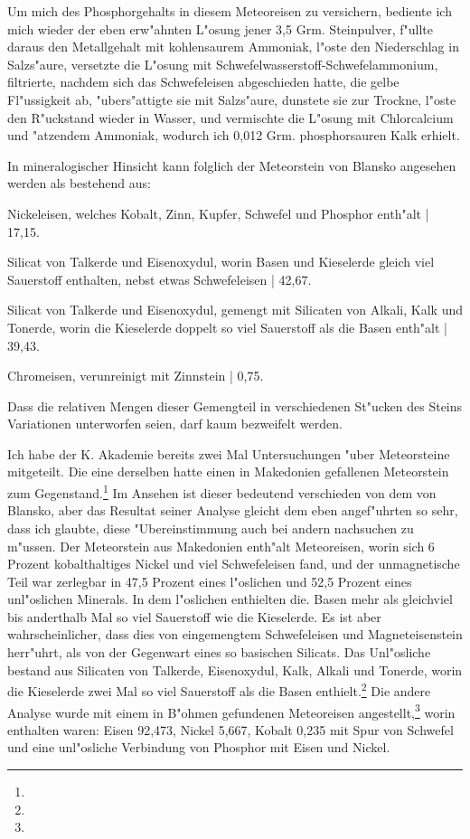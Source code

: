 \documentclass[a4paper, 11pt, oneside]{article}
\begin{document}
Um mich des Phosphorgehalts in diesem Meteoreisen zu versichern, bediente ich mich wieder der eben erw"ahnten L"osung jener 3,5 Grm. Steinpulver, f"ullte daraus den Metallgehalt mit kohlensaurem Ammoniak‚ l"oste den Niederschlag in Salzs"aure, versetzte die L"osung mit Schwefelwasserstoff-Schwefelammonium, filtrierte, nachdem sich das Schwefeleisen abgeschieden hatte, die gelbe Fl"ussigkeit ab, "ubers"attigte sie mit Salzs"aure, dunstete sie zur Trockne, l"oste den R"uckstand wieder in Wasser, und vermischte die L"osung mit Chlorcalcium und "atzendem Ammoniak, wodurch ich 0,012 Grm. phosphorsauren Kalk erhielt.

In mineralogischer Hinsicht kann folglich der Meteorstein von Blansko angesehen werden als bestehend aus:

Nickeleisen, welches Kobalt, Zinn, Kupfer, Schwefel und Phosphor enth"alt | 17,15.

Silicat von Talkerde und Eisenoxydul, worin Basen und Kieselerde gleich viel Sauerstoff enthalten, nebst etwas Schwefeleisen | 42,67.

Silicat von Talkerde und Eisenoxydul, gemengt mit Silicaten von Alkali, Kalk und Tonerde, worin die Kieselerde doppelt so viel Sauerstoff als die Basen enth"alt | 39,43.

Chromeisen, verunreinigt mit Zinnstein | 0,75.

Dass die relativen Mengen dieser Gemengteil in verschiedenen St"ucken des Steins Variationen unterworfen seien, darf kaum bezweifelt werden.

Ich habe der K. Akademie bereits zwei Mal Untersuchungen "uber Meteorsteine mitgeteilt. Die eine derselben hatte einen in Makedonien gefallenen Meteorstein zum Gegenstand.\footnote{} Im Ansehen ist dieser bedeutend verschieden von dem von Blansko, aber das Resultat seiner Analyse gleicht dem eben angef"uhrten so sehr, dass ich glaubte, diese "Ubereinstimmung auch bei andern nachsuchen zu m"ussen. Der Meteorstein aus Makedonien enth"alt Meteoreisen, worin sich 6 Prozent kobalthaltiges Nickel und viel Schwefeleisen fand, und der unmagnetische Teil war zerlegbar in 47,5 Prozent eines l"oslichen und 52,5 Prozent eines unl"oslichen Minerals. In dem l"oslichen enthielten die. Basen mehr als gleichviel bis anderthalb Mal so viel Sauerstoff wie die Kieselerde. Es ist aber wahrscheinlicher, dass dies von eingemengtem Schwefeleisen und Magneteisenstein herr"uhrt, als von der Gegenwart eines so basischen Silicats. Das Unl"osliche bestand aus Silicaten von Talkerde, Eisenoxydul, Kalk, Alkali und Tonerde, worin die Kieselerde zwei Mal so viel Sauerstoff als die Basen enthielt.\footnote{} Die andere Analyse wurde mit einem in B"ohmen gefundenen Meteoreisen angestellt,\footnote{} worin enthalten waren: Eisen 92,473, Nickel 5,667, Kobalt 0,235 mit Spur von Schwefel und eine unl"osliche Verbindung von Phosphor mit Eisen und Nickel.
\end{document}
